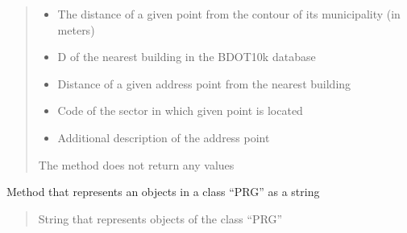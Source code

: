 \documentclass[letterpaper,10pt,english]{sphinxmanual}
\begin{document}
\begin{fulllineitems}
\begin{fulllineitems}
\begin{quote}
\begin{description}
\begin{itemize}
\item {} 
\sphinxAtStartPar
{} \textendash{} The distance of a given point from the contour of its municipality (in meters)

\item {} 
\sphinxAtStartPar
{} \textendash{} D of the nearest building in the BDOT10k database

\item {} 
\sphinxAtStartPar
{} \textendash{} Distance of a given address point from the nearest building

\item {} 
\sphinxAtStartPar
{} \textendash{} Code of the sector in which given point is located

\item {} 
\sphinxAtStartPar
{} \textendash{} Additional description of the address point

\end{itemize}

\sphinxAtStartPar
The method does not return any values

\end{description}\end{quote}

\end{fulllineitems}


\begin{fulllineitems}
\label{\detokenize{db_classes:db_classes.PRG.__repr__}}
\pysigstartsignatures
{}
\pysigstopsignatures
\sphinxAtStartPar
Method that represents an objects in a class “PRG” as a string
\begin{quote}\begin{description}
\sphinxAtStartPar
{}

\sphinxAtStartPar
String that represents objects of the class “PRG”

\end{description}\end{quote}

\end{fulllineitems}


\end{fulllineitems}
\end{document}
